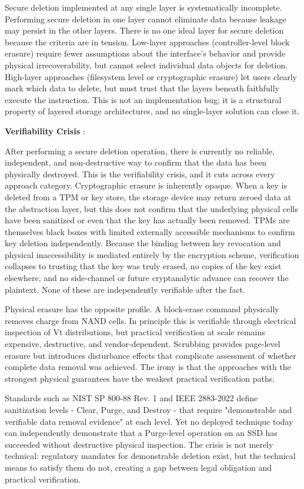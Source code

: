 Secure deletion implemented at any single layer is systematically incomplete. Performing secure 
deletion in one layer cannot eliminate data because leakage may persist in the other layers. There 
is no one ideal layer for secure deletion because the criteria are in tension. Low-layer approaches 
(controller-level block erasure) require fewer assumptions about the interface's behavior and 
provide physical irrecoverability, but cannot select individual data objects for deletion. 
High-layer approaches (filesystem level or cryptographic erasure) let users clearly mark which 
data to delete, but must trust that the layers beneath faithfully execute the instruction. This is 
not an implementation bug; it is a structural property of layered storage architectures, and no 
single-layer solution can close it.


\textbf{Verifiability Crisis} : 

After performing a secure deletion operation, there is currently 
no reliable, independent, and non-destructive way to confirm that the data has been physically 
destroyed. This is the verifiability crisis, and it cuts across every approach category. 
Cryptographic erasure is inherently opaque. When a key is deleted from a TPM or key store, the 
storage device may return zeroed data at the abstraction layer, but this does not confirm that the 
underlying physical cells have been sanitized or even that the key has actually been removed. TPMs 
are themselves black boxes with limited externally accessible mechanisms to confirm key deletion 
independently. Because the binding between key revocation and physical inaccessibility is mediated 
entirely by the encryption scheme, verification collapses to trusting that the key was truly erased, 
no copies of the key exist elsewhere, and no side-channel or future cryptanalytic advance can 
recover the plaintext. None of these are independently verifiable after the fact. 

Physical erasure has the opposite profile. A block-erase command physically removes charge from 
NAND cells. In principle this is verifiable through electrical inspection of Vt distributions, but 
practical verification at scale remains expensive, destructive, and vendor-dependent. Scrubbing 
provides page-level erasure but introduces disturbance effects that complicate assessment of 
whether complete data removal was achieved. The irony is that the approaches with the strongest 
physical guarantees have the weakest practical verification paths.

Standards such as NIST SP 800-88 Rev. 1 and IEEE 2883-2022 define sanitization levels - Clear, 
Purge, and Destroy - that require "demonstrable and verifiable data removal evidence" at each level.
Yet no deployed technique today can independently demonstrate that a Purge-level operation on an 
SSD has succeeded without destructive physical inspection. The crisis is not merely technical: 
regulatory mandates for demonstrable deletion exist, but the technical means to satisfy them do not, 
creating a gap between legal obligation and practical verification.

